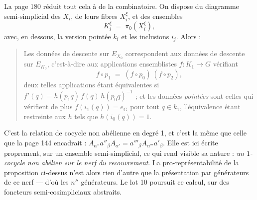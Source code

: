 \documentclass[11pt,a4paper]{article}
\begin{document}
La page 180 réduit tout cela à de la combinatoire. On dispose du diagramme
semi-simplicial des $X_{i}$, de leurs fibres $X_{i}^{\xi}$, et des ensembles
\[
  K_{i}^{\xi} \;=\; \pi_{0}(X_{i}^{\xi}) ,
\]
avec, en dessous, la version pointée $k_{i}$ et les inclusions $i_{j}$. Alors :

\begin{quote}
Les données de descente sur $E_{X_{0}}$ correspondent aux données de descente
sur $E_{K_{0}}$, c'est-à-dire aux applications ensemblistes
$f : K_{1} \to G$ vérifiant
\[
  f \circ p_{1} \;=\; (f \circ p_{0})\,(f \circ p_{2}) ,
\]
deux telles applications étant équivalentes si
$f'(q) = h(p_{1}q)\, f(q)\, h(p_{0}q)^{-1}$ ; et les données \emph{pointées}
sont celles qui vérifient de plus $f(i_{1}(q)) = e_{G}$ pour tout
$q \in k_{1}$, l'équivalence étant restreinte aux $h$ tels que
$h(i_{0}(q)) = 1$.
\end{quote}

C'est la relation de cocycle non abélienne en degré 1, et c'est la même que
celle que la page 144 encadrait : $A_{\alpha''} a''_{\beta} A_{\alpha'} =
a'''_{\beta} A_{\alpha'''} a'_{\beta}$. Elle est ici écrite proprement, sur
un ensemble semi-simplicial, ce qui rend visible sa nature : \emph{un
$1$-cocycle non abélien sur le nerf du recouvrement}. La
pro-représentabilité de la proposition ci-dessus n'est alors rien d'autre que
la présentation par générateurs de ce nerf --- d'où les $n''$ générateurs. Le
lot 10 poursuit ce calcul, sur des foncteurs semi-cosimpliciaux abstraits.
\end{document}
